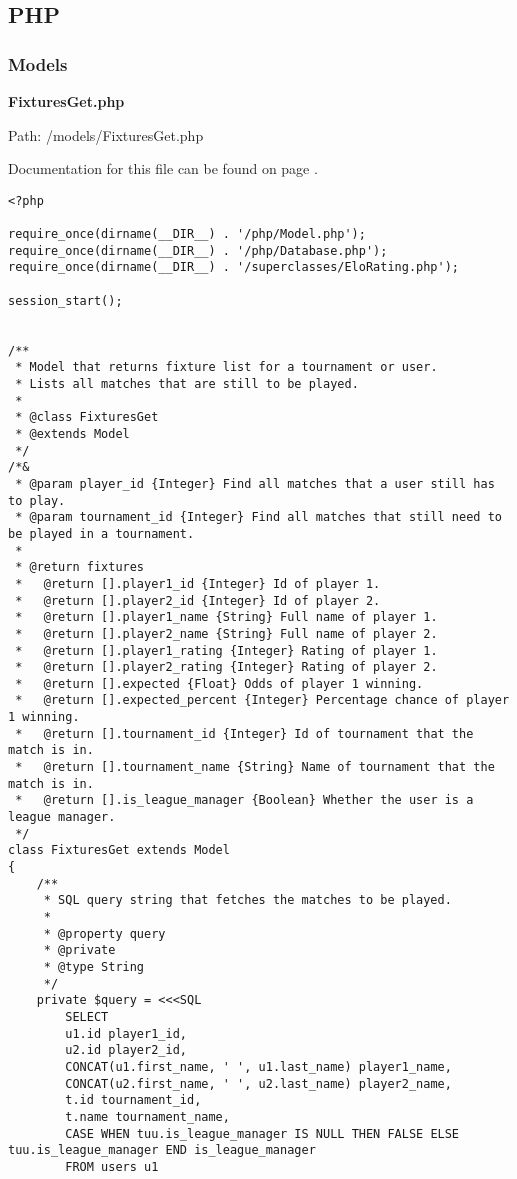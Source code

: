 \newpage
\subsection{PHP}\label{PHP}
\subsubsection{Models}
\textbf{FixturesGet.php}\label{FixturesGet.php}

Path: /models/FixturesGet.php

Documentation for this file can be found on page \pageref{FixturesGet.php.doc}.

{\scriptsize
\begin{lstlisting}
<?php

require_once(dirname(__DIR__) . '/php/Model.php');
require_once(dirname(__DIR__) . '/php/Database.php');
require_once(dirname(__DIR__) . '/superclasses/EloRating.php');

session_start();


/**
 * Model that returns fixture list for a tournament or user.
 * Lists all matches that are still to be played.
 *
 * @class FixturesGet
 * @extends Model
 */
/*&
 * @param player_id {Integer} Find all matches that a user still has to play.
 * @param tournament_id {Integer} Find all matches that still need to be played in a tournament.
 *
 * @return fixtures
 *   @return [].player1_id {Integer} Id of player 1.
 *   @return [].player2_id {Integer} Id of player 2.
 *   @return [].player1_name {String} Full name of player 1.
 *   @return [].player2_name {String} Full name of player 2.
 *   @return [].player1_rating {Integer} Rating of player 1.
 *   @return [].player2_rating {Integer} Rating of player 2.
 *   @return [].expected {Float} Odds of player 1 winning.
 *   @return [].expected_percent {Integer} Percentage chance of player 1 winning.
 *   @return [].tournament_id {Integer} Id of tournament that the match is in.
 *   @return [].tournament_name {String} Name of tournament that the match is in.
 *   @return [].is_league_manager {Boolean} Whether the user is a league manager.
 */
class FixturesGet extends Model
{
	/**
	 * SQL query string that fetches the matches to be played.
	 *
	 * @property query
	 * @private
	 * @type String
	 */
	private $query = <<<SQL
		SELECT
		u1.id player1_id,
		u2.id player2_id,
		CONCAT(u1.first_name, ' ', u1.last_name) player1_name,
		CONCAT(u2.first_name, ' ', u2.last_name) player2_name,
		t.id tournament_id,
		t.name tournament_name,
		CASE WHEN tuu.is_league_manager IS NULL THEN FALSE ELSE tuu.is_league_manager END is_league_manager
		FROM users u1


\end{lstlisting}}
